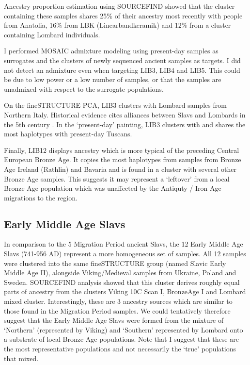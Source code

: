 Ancestry proportion estimation using SOURCEFIND showed that the cluster containing these samples shares 25\% of their ancestry most recently with people from Anatolia, 16\% from LBK (Linearbandkeramik) and 12\% from a cluster containing Lombard individuals. 

I performed MOSAIC admixture modeling using present-day samples as surrogates and the clusters of newly sequenced ancient samples as targets. I did not detect an admixture even when targeting LIB3, LIB4 and LIB5. This could be due to low power or a low number of samples, or that the samples are unadmixed with respect to the surrogate populations.

On the fineSTRUCTURE PCA, LIB3 clusters with Lombard samples from Northern Italy. Historical evidence cites alliances between Slavs and Lombards in the 5th century \cite{lotter2003volkerverschiebungen}. In the `present-day' painting, LIB3 clusters with and shares the most haplotypes with present-day Tuscans.  

Finally, LIB12 displays ancestry which is more typical of the preceding Central European Bronze Age. It copies the most haplotypes from samples from Bronze Age Ireland (Rathlin) and Bavaria and is found in a cluster with several other Bronze Age samples. This suggests it may represent a `leftover' from a local Bronze Age population which was unaffected by the Antiquty / Iron Age migrations to the region.

\subsection{Early Middle Age Slavs}

In comparison to the 5 Migration Period ancient Slavs, the 12 Early Middle Age Slavs (741-956 AD) represent a more homogeneous set of samples. All 12 samples were clustered into the same fineSTRUCTURE group (named Slavic Early Middle Age II), alongside Viking/Medieval samples from Ukraine, Poland and Sweden. SOURCEFIND analysis showed that this cluster derives roughly equal parts of ancestry from the clusters  Viking 10C Scan I, BronzeAge I and Lombard mixed cluster. Interestingly, these are 3 ancestry sources which are similar to those found in the Migration Period samples. We could tentatively therefore suggest that the Early Middle Age Slavs were formed from the mixture of `Northern' (represented by Viking) and `Southern' represented by Lombard onto a substrate of local Bronze Age populations. Note that I suggest that these are the most representative populations and not necessarily the `true' populations that mixed.

